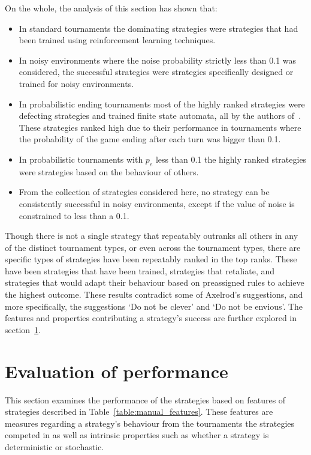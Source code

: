 On the whole, the analysis of this section has shown that:

\begin{itemize}
    \item In standard tournaments the dominating strategies were
    strategies that had been trained using reinforcement learning techniques.
    \item In noisy environments where the noise probability strictly less than
    0.1 was considered, the successful strategies were strategies specifically
    designed or trained for noisy environments.
    \item In probabilistic ending tournaments most of the highly ranked
    strategies were defecting strategies and trained finite state automata, all
    by the authors of~\cite{Ashlock2006, Ashlock2014}. These strategies ranked
    high due to their performance in tournaments where the probability of the
    game ending after each turn was bigger than 0.1.
    \item In probabilistic tournaments with \(p_e\) less than 0.1 the highly
    ranked strategies were strategies based on the behaviour of others.
    \item From the collection of strategies considered here,  no strategy can be
    consistently successful in noisy environments, except if the value of noise
    is constrained to less than a 0.1.
\end{itemize}

Though there is not a single strategy that repeatably outranks all others in any
of the distinct tournament types, or even across the tournament types, there
are specific types of strategies have been repeatably ranked in the top ranks.
These have been strategies that have been trained, strategies that retaliate,
and strategies that would adapt their behaviour based on preassigned rules
to achieve the highest outcome. These results contradict some of Axelrod's suggestions,
and more specifically, the suggestions `Do not be clever' and `Do not be envious'.
The features and properties contributing a strategy's success are further
explored in section~\ref{section:evaluation_of_performance}.

\section{Evaluation of performance}\label{section:evaluation_of_performance}

This section examines the performance of the strategies based on features of strategies described in
Table~\ref{table:manual_features}. These features are measures regarding a
strategy's behaviour from the tournaments the strategies competed in as well as
intrinsic properties such as whether a strategy is deterministic or stochastic.

